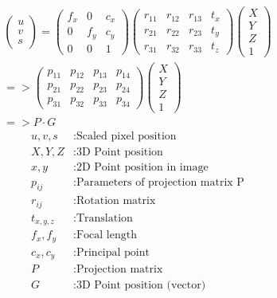 \documentclass[11pt,a4paper,titlepage,oneside]{report}
\begin{document}
\begin{equation}\label{eq:pe_warped}
  \begin{split}
  \begin{pmatrix}
    u \\
    v \\
    s
  \end{pmatrix}=
  \begin{pmatrix}
    f_x & 0 & c_x \\
    0 & f_y & c_y \\
    0 & 0 & 1
  \end{pmatrix}
  \begin{pmatrix}
    r_{11} & r_{12} & r_{13} & t_x \\
    r_{21} & r_{22} & r_{23} & t_y \\
    r_{31} & r_{32} & r_{33} & t_z
  \end{pmatrix}
  \begin{pmatrix}
    X\\
    Y\\
    Z\\
    1
  \end{pmatrix}\\
  =>\begin{pmatrix}
    p_{11} & p_{12} & p_{13} & p_{14} \\
    p_{21} & p_{22} & p_{23} & p_{24} \\
    p_{31} & p_{32} & p_{33} & p_{34}
  \end{pmatrix}
  \begin{pmatrix}
    X\\
    Y\\
    Z\\
    1
  \end{pmatrix}\\
  =>P \cdot G
\end{split}
\end{equation}
\begin{align*}
  u,v,s     &: \text{Scaled pixel position}\\
  X,Y,Z     &: \text{3D Point position}\\
  x,y       &: \text{2D Point position in image}\\
  p_{ij}    &: \text{Parameters of projection matrix P}\\
  r_{ij}    &: \text{Rotation matrix}\\
  t_{x,y,z} &: \text{Translation}\\
  f_x,f_y   &: \text{Focal length}\\
  c_x,c_y   &: \text{Principal point}\\
  P         &: \text{Projection matrix}\\
  G         &: \text{3D Point position (vector)}
\end{align*}
\end{document}
